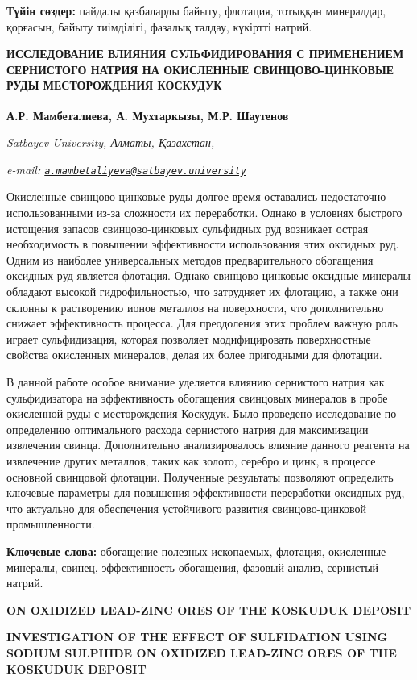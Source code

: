 {{\bfseries Түйін сөздер:} пайдалы қазбаларды байыту, флотация, тотыққан
минералдар, қорғасын, байыту тиімділігі, фазалық талдау, күкіртті
натрий.

{\bfseries ИССЛЕДОВАНИЕ ВЛИЯНИЯ СУЛЬФИДИРОВАНИЯ С ПРИМЕНЕНИЕМ СЕРНИСТОГО
НАТРИЯ НА ОКИСЛЕННЫЕ СВИНЦОВО-ЦИНКОВЫЕ РУДЫ МЕСТОРОЖДЕНИЯ КОСКУДУК}

{\bfseries А.Р. Мамбеталиева\textsuperscript{\envelope }, А. Мухтаркызы, М.Р.
Шаутенов}

\emph{Satbayev University, Алматы, Қазахстан,}

\emph{e-mail:
\href{mailto:a.mambetaliyeva@satbayev.university}{\nolinkurl{a.mambetaliyeva@satbayev.university}}}

Окисленные свинцово-цинковые руды долгое время оставались недостаточно
использованными из-за сложности их переработки. Однако в условиях
быстрого истощения запасов свинцово-цинковых сульфидных руд возникает
острая необходимость в повышении эффективности использования этих
оксидных руд. Одним из наиболее универсальных методов предварительного
обогащения оксидных руд является флотация. Однако свинцово-цинковые
оксидные минералы обладают высокой гидрофильностью, что затрудняет их
флотацию, а также они склонны к растворению ионов металлов на
поверхности, что дополнительно снижает эффективность процесса. Для
преодоления этих проблем важную роль играет сульфидизация, которая
позволяет модифицировать поверхностные свойства окисленных минералов,
делая их более пригодными для флотации.

В данной работе особое внимание уделяется влиянию сернистого натрия как
сульфидизатора на эффективность обогащения свинцовых минералов в пробе
окисленной руды с месторождения Коскудук. Было проведено исследование по
определению оптимального расхода сернистого натрия для максимизации
извлечения свинца. Дополнительно анализировалось влияние данного
реагента на извлечение других металлов, таких как золото, серебро и
цинк, в процессе основной свинцовой флотации. Полученные результаты
позволяют определить ключевые параметры для повышения эффективности
переработки оксидных руд, что актуально для обеспечения устойчивого
развития свинцово-цинковой промышленности.

{\bfseries Ключевые слова:} обогащение полезных ископаемых, флотация,
окисленные минералы, свинец, эффективность обогащения, фазовый анализ,
сернистый натрий.

{\bfseries ON OXIDIZED LEAD-ZINC ORES OF THE KOSKUDUK DEPOSIT}

{\bfseries INVESTIGATION OF THE EFFECT OF SULFIDATION USING SODIUM SULPHIDE
ON OXIDIZED LEAD-ZINC ORES OF THE KOSKUDUK DEPOSIT}

}
